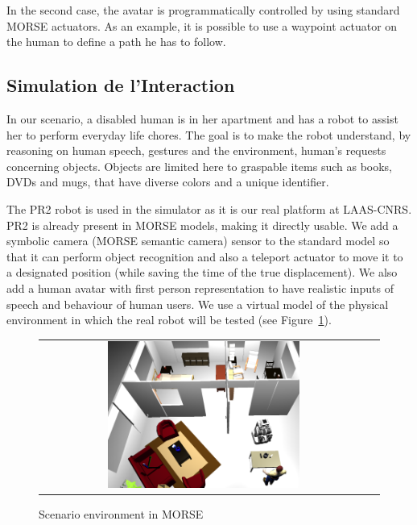 \documentclass[a4paper,11pt,twoside]{StyleThese}
\begin{document}
In the second case, the avatar is programmatically controlled by using standard MORSE actuators. As an example, it is possible to use a waypoint actuator on the human to define a path he has to follow.


\subsection{Simulation de l'Interaction}
In our scenario, a disabled human is in her apartment and has a robot to assist her to perform everyday life chores.
The goal is to make the robot understand, by reasoning on human speech, gestures and the environment, human's requests concerning objects. Objects are limited here to graspable items such as books, DVDs and mugs, that have diverse colors and a unique identifier.

The PR2 robot is used in the simulator as it is our real platform at LAAS-CNRS. PR2 is already present in MORSE models, making it directly usable. We add a symbolic camera (MORSE semantic camera) sensor to the standard model so that it can perform object recognition and also a teleport actuator to move it to a designated position (while saving the time of the true displacement). We also add a human avatar with first person representation to have realistic inputs of speech and behaviour of human users. We use a virtual model of the physical environment in which the real robot will be tested (see Figure~\ref{fig:env}).

\begin{figure}[ht!]
 \centering
 \begin{tabular}{cc}
  \includegraphics[width=0.6\textwidth]{img/LAASMORSE.png}
 \end{tabular}
 \caption{Scenario environment in MORSE}
 \label{fig:env}
 \end{figure}
 
\end{document}
